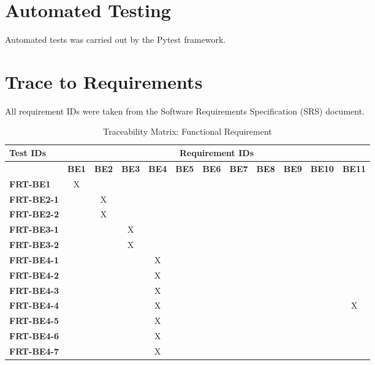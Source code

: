 \documentclass[12pt, titlepage]{article}
\begin{document}
\section{Automated Testing}
Automated tests was carried out by the Pytest framework.

\section{Trace to Requirements}
All requirement IDs were taken from the Software Requirements Specification (SRS) document.

\begin{table}[H]
    \centering
    \caption{Traceability Matrix: Functional Requirement}
    \begin{adjustbox}{max width=0.7\paperwidth}
    \begin{tabular}{l|ccccccccccc}
        \textbf{Test IDs} & \multicolumn{11}{c}{\textbf{Requirement IDs}}\\
        \hline
        ~ & \textbf{BE1} & \textbf{BE2} & \textbf{BE3} & \textbf{BE4} & \textbf{BE5} & \textbf{BE6} & \textbf{BE7} & \textbf{BE8} & \textbf{BE9} & \textbf{BE10} & \textbf{BE11}\\
        \textbf{FRT-BE1}    & X & ~ & ~ & ~ & ~ & ~ & ~ & ~ & ~ & ~ & ~\\
        \textbf{FRT-BE2-1}  & ~ & X & ~ & ~ & ~ & ~ & ~ & ~ & ~ & ~ & ~\\
        \textbf{FRT-BE2-2}  & ~ & X & ~ & ~ & ~ & ~ & ~ & ~ & ~ & ~ & ~\\
        \textbf{FRT-BE3-1}  & ~ & ~ & X & ~ & ~ & ~ & ~ & ~ & ~ & ~ & ~\\
        \textbf{FRT-BE3-2}  & ~ & ~ & X & ~ & ~ & ~ & ~ & ~ & ~ & ~ & ~\\
        \textbf{FRT-BE4-1}  & ~ & ~ & ~ & X & ~ & ~ & ~ & ~ & ~ & ~ & ~\\
        \textbf{FRT-BE4-2}  & ~ & ~ & ~ & X & ~ & ~ & ~ & ~ & ~ & ~ & ~\\
        \textbf{FRT-BE4-3}  & ~ & ~ & ~ & X & ~ & ~ & ~ & ~ & ~ & ~ & ~\\
        \textbf{FRT-BE4-4}  & ~ & ~ & ~ & X & ~ & ~ & ~ & ~ & ~ & ~ & X\\
        \textbf{FRT-BE4-5}  & ~ & ~ & ~ & X & ~ & ~ & ~ & ~ & ~ & ~ & ~\\
        \textbf{FRT-BE4-6}  & ~ & ~ & ~ & X & ~ & ~ & ~ & ~ & ~ & ~ & ~\\
        \textbf{FRT-BE4-7}  & ~ & ~ & ~ & X & ~ & ~ & ~ & ~ & ~ & ~ & ~\\

\end{tabular}
\end{adjustbox}
\end{table}
\end{document}
